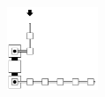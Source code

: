 \begin{figure}[H]
\begin{minipage}[b]{.64\textwidth}
\begin{subfigure}[t]{0.3\textwidth}
            \caption{\label{fig:read_next_1or2_op_msr_msd}}
        \end{subfigure}%
        ~
        \begin{subfigure}[t]{0.3\textwidth}
            \centering
            \includegraphics[width=0.3\textwidth]{return_paths_read_next_3_op-or-seed_msr_msd}
            \caption{\label{fig:read_next_3_oporseed_msr_msd}}
        \end{subfigure}%
        ~


\end{minipage}
\end{figure}
